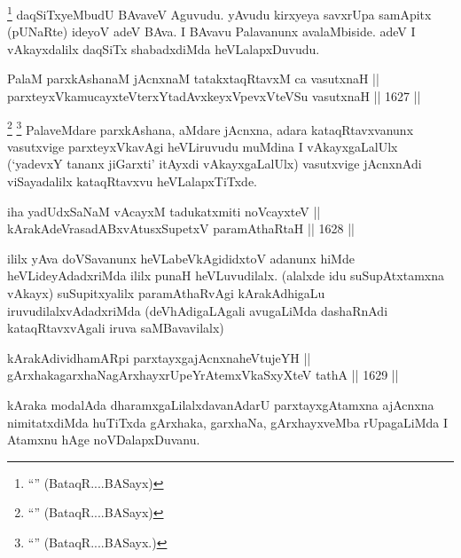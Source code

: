 \begin{artha}
\footnote{``\stext'' (BataqR....BASayx)}
daqSiTxyeMbudU BAvaveV Aguvudu. yAvudu kirxyeya savxrUpa samApitx (pUNaRte) ideyoV adeV BAva. I BAvavu Palavanunx avalaMbiside. adeV I vAkayxdalilx daqSiTx shabadxdiMda heVLalapxDuvudu.
\end{artha}


\begin{shl}
PalaM parxkAshanaM jAcnxnaM tatakxtaqRtavxM ca vasutxnaH || \\
parxteyxVkamucayxteV\s terxYtadAvxkeyxVpevxVteVSu vasutxnaH ||  1627 ||  
\end{shl}

\begin{artha}
\footnote{``\stext'' (BataqR....BASayx)}
\footnote{``\stext'' (BataqR....BASayx.)}
PalaveMdare parxkAshana, aMdare jAcnxna, adara kataqRtavxvanunx vasutxvige parxteyxVkavAgi heVLiruvudu muMdina I vAkayxgaLalUlx (`yadevxY tananx jiGarxti' itAyxdi vAkayxgaLalUlx) vasutxvige jAcnxnAdi viSayadalilx kataqRtavxvu heVLalapxTiTxde.
\end{artha}



\begin{shl}
iha yadUdxSaNaM vAcayxM tadukatxmiti noVcayxteV || \\
kArakAdeVrasadABxvAtusxSupetxV paramAthaRtaH ||  1628 ||  
\end{shl}

\begin{artha}
ililx yAva doVSavanunx heVLabeVkAgididxtoV adanunx hiMde heVLideyAdadxriMda ililx punaH heVLuvudilalx. (alalxde idu suSupAtxtamxna vAkayx) suSupitxyalilx paramAthaRvAgi kArakAdhigaLu iruvudilalxvAdadxriMda (deVhAdigaLAgali avugaLiMda dashaRnAdi kataqRtavxvAgali iruva saMBavavilalx)
\end{artha}


\begin{shl}
kArakAdividhamAR\s pi parxtayxgajAcnxnaheVtujeYH || \\
gArxhakagarxhaNagArxhayxrUpeYrAtemxVkaSxyXteV tathA ||  1629 ||  
\end{shl}

\begin{artha}
kAraka modalAda dharamxgaLilalxdavanAdarU parxtayxgAtamxna ajAcnxna nimitatxdiMda huTiTxda gArxhaka, garxhaNa, gArxhayxveMba rUpagaLiMda I Atamxnu hAge noVDalapxDuvanu.
\end{artha}

